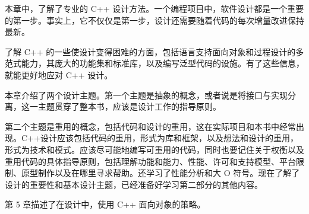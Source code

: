 本章中，了解了专业的 C++ 设计方法。一个编程项目中，软件设计都是一个重要的第一步。事实上，它不仅仅是第一步，设计还需要随着代码的每次增量改进保持最新。

了解 C++ 的一些使设计变得困难的方面，包括语言支持面向对象和过程设计的多范式能力，其庞大的功能集和标准库，以及编写泛型代码的设施。有了这些信息，就能更好地应对 C++ 设计。

本章介绍了两个设计主题。第一个主题是抽象的概念，或者说是将接口与实现分离，这一主题贯穿了整本书，应该是设计工作的指导原则。

第二个主题是重用的概念，包括代码和设计的重用，这在实际项目和本书中经常出现。C++设计应该包括代码的重用，形式为库和框架，以及想法和设计的重用，形式为技术和模式。应该尽可能地编写可重用的代码，同时也要记住关于权衡以及重用代码的具体指导原则，包括理解功能和能力、性能、许可和支持模型、平台限制、原型制作以及在哪里寻求帮助。还学习了性能分析和大 O 符号。现在了解了设计的重要性和基本设计主题，已经准备好学习第二部分的其他内容。

第 5 章描述了在设计中，使用 C++ 面向对象的策略。